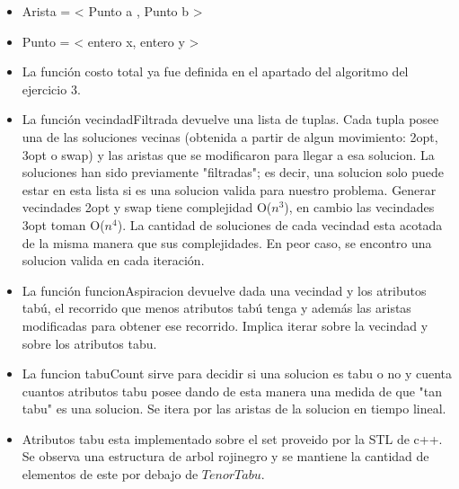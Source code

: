 \begin{itemize}
\item Arista = < Punto a , Punto b >
\item Punto = < entero x, entero y >
\item La función costo total ya fue definida en el apartado del algoritmo del ejercicio 3.
\item La función vecindadFiltrada devuelve una lista de tuplas. Cada tupla posee una de las soluciones vecinas (obtenida a partir de algun movimiento: 2opt, 3opt o swap) y las aristas que se modificaron para llegar a esa solucion. La soluciones han sido previamente "filtradas"; es decir, una solucion solo puede estar en esta lista si es una solucion valida para nuestro problema. Generar vecindades 2opt y swap tiene complejidad O($n^3$), en cambio las vecindades 3opt toman O($n^4$).
	La cantidad de soluciones de cada vecindad esta acotada de la misma manera que sus complejidades. En peor caso, se encontro una solucion valida en cada iteraci\'on.
\item La función funcionAspiracion devuelve dada una vecindad y los atributos tabú, el recorrido que menos atributos tabú tenga y además las aristas modificadas para obtener ese recorrido. Implica iterar sobre la vecindad y sobre los atributos tabu. 
\item La funcion tabuCount sirve para decidir si una solucion es tabu o no y cuenta cuantos atributos tabu posee dando de esta manera una medida de que "tan tabu" es una solucion. Se itera por las aristas de la solucion en tiempo lineal.
\item Atributos tabu esta implementado sobre el set proveido por la STL de c++. Se observa una estructura de arbol rojinegro y se mantiene la cantidad de elementos de este por debajo de $TenorTabu$.
\end{itemize}

